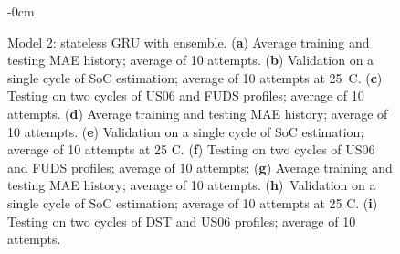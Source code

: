 \begin{figure}[H]
\begin{adjustwidth}{-\extralength}{0cm}
\begin{subfigure}[b]{0.44\textwidth}
    \end{subfigure}
    \hfill
    \begin{subfigure}[b]{0.45\textwidth}
        \centering
        
        \caption{\vspace{+2pt}\centering}
    \end{subfigure}
    \hfill
    \begin{subfigure}[b]{0.425\textwidth}
        \centering
        
        \caption{\vspace{+2pt}\centering}
    \end{subfigure}
    \end{adjustwidth}
    \caption{Model 2: stateless GRU with ensemble. (\textbf{a}) Average training and testing MAE history; average of 10 attempts. (\textbf{b}) Validation on a single cycle of SoC estimation; average of 10 attempts at 25~\textdegree{}C. (\textbf{c}) Testing on two cycles of US06 and FUDS profiles; average of 10 attempts. (\textbf{d}) Average training and testing MAE history; average of 10 attempts. (\textbf{e}) Validation on a single cycle of SoC estimation; average of 10 attempts at 25 \textdegree{}C. (\textbf{f}) Testing on two cycles of US06 and FUDS profiles; average of 10 attempts; (\textbf{g}) Average training and testing MAE history; average of 10 attempts. (\textbf{h})~Validation on a single cycle of SoC estimation; average of 10 attempts at 25 \textdegree{}C. (\textbf{i}) Testing on two cycles of DST and US06 profiles; average of 10 attempts.}
    \label{fig:Model-2res}
\end{figure}
\clearpage
